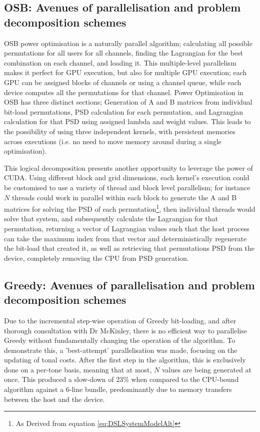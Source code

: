 \subsection{OSB: Avenues of parallelisation and problem decomposition schemes}
OSB power optimisation is a naturally parallel algorithm; calculating all possible permutations for all users for all channels, finding the Lagrangian for the best combination on each channel, and loading it. This multiple-level parallelism makes it perfect for GPU execution, but also for multiple GPU execution; each GPU can be assigned blocks of channels or using a channel queue, while each device computes all the permutations for that channel.
Power Optimisation in OSB has three distinct sections; Generation of A and B matrices from individual bit-load permutations, PSD calculation for each permutation, and Lagrangian calculation for that PSD using assigned lambda and weight values. This leads to the possibility of using three independent kernels, with persistent memories across executions (i.e. no need to move memory around during a single optimisation).

This logical decomposition presents another opportunity to leverage the power of CUDA. Using different block and grid dimensions, each kernel's execution could be customised to use a variety of thread and block level parallelism; for instance \(N\) threads could work in parallel within each block to generate the A and B matrices for solving the PSD of each permutation\footnote{As Derived from equation \eqref{eq:DSLSystemModelAlt}}, then individual threads would solve that system, and subsequently calculate the Lagrangian for that permutation, returning a vector of Lagrangian values such that the host process can take the maximum index from that vector and deterministically regenerate the bit-load that created it, as well as retrieving that permutations PSD from the device, completely removing the CPU from PSD generation.

\subsection{Greedy: Avenues of parallelisation and problem decomposition schemes}
Due to the incremental step-wise operation of Greedy bit-loading, and after thorough consultation with Dr McKinley, there is no efficient way to parallelise Greedy without fundamentally changing the operation of the algorithm. To demonstrate this, a 'best-attempt' parallelisation was made, focusing on the updating of tonal costs. After the first step in the algorithm, this is exclusively done on a per-tone basis, meaning that at most, \(N\) values are being generated at once. This produced a slow-down of 23\% when compared to the CPU-bound algorithm against a 6-line bundle, predominantly due to memory transfers between the host and the device.

